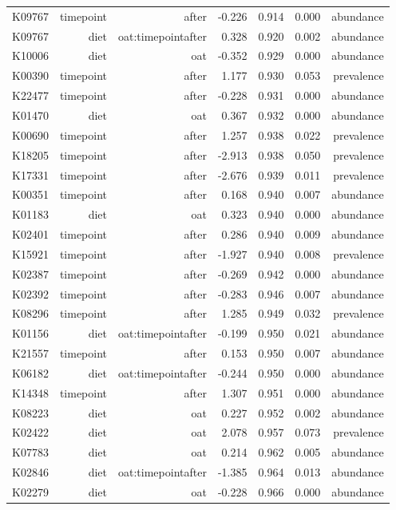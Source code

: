 \documentclass[
]{article}
\begin{document}
\begin{longtable}[t]{lrrrrrr}
K09767 & timepoint & after & -0.226 & 0.914 & 0.000 & abundance\\
K09767 & diet & oat:timepointafter & 0.328 & 0.920 & 0.002 & abundance\\
K10006 & diet & oat & -0.352 & 0.929 & 0.000 & abundance\\
K00390 & timepoint & after & 1.177 & 0.930 & 0.053 & prevalence\\
\addlinespace
K22477 & timepoint & after & -0.228 & 0.931 & 0.000 & abundance\\
K01470 & diet & oat & 0.367 & 0.932 & 0.000 & abundance\\
K00690 & timepoint & after & 1.257 & 0.938 & 0.022 & prevalence\\
K18205 & timepoint & after & -2.913 & 0.938 & 0.050 & prevalence\\
K17331 & timepoint & after & -2.676 & 0.939 & 0.011 & prevalence\\
\addlinespace
K00351 & timepoint & after & 0.168 & 0.940 & 0.007 & abundance\\
K01183 & diet & oat & 0.323 & 0.940 & 0.000 & abundance\\
K02401 & timepoint & after & 0.286 & 0.940 & 0.009 & abundance\\
K15921 & timepoint & after & -1.927 & 0.940 & 0.008 & prevalence\\
K02387 & timepoint & after & -0.269 & 0.942 & 0.000 & abundance\\
\addlinespace
K02392 & timepoint & after & -0.283 & 0.946 & 0.007 & abundance\\
K08296 & timepoint & after & 1.285 & 0.949 & 0.032 & prevalence\\
K01156 & diet & oat:timepointafter & -0.199 & 0.950 & 0.021 & abundance\\
K21557 & timepoint & after & 0.153 & 0.950 & 0.007 & abundance\\
K06182 & diet & oat:timepointafter & -0.244 & 0.950 & 0.000 & abundance\\
\addlinespace
K14348 & timepoint & after & 1.307 & 0.951 & 0.000 & abundance\\
K08223 & diet & oat & 0.227 & 0.952 & 0.002 & abundance\\
K02422 & diet & oat & 2.078 & 0.957 & 0.073 & prevalence\\
K07783 & diet & oat & 0.214 & 0.962 & 0.005 & abundance\\
K02846 & diet & oat:timepointafter & -1.385 & 0.964 & 0.013 & abundance\\
\addlinespace
K02279 & diet & oat & -0.228 & 0.966 & 0.000 & abundance\\

\end{longtable}
\end{document}
